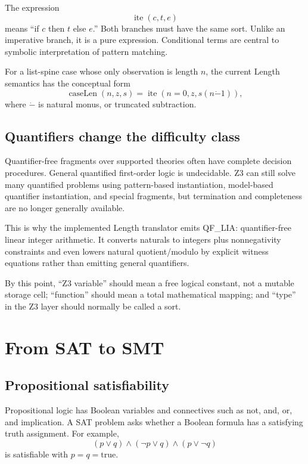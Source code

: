\documentclass[10pt,letterpaper,oneside]{report}
\newcommand{\QFLIA}{\textsf{QF\_LIA}}
\begin{document}
The expression
\[
  \operatorname{ite}(c,t,e)
\]
means ``if $c$ then $t$ else $e$.'' Both branches must have the same sort. Unlike an imperative branch, it is a pure expression. Conditional terms are central to symbolic interpretation of pattern matching.

For a list-spine case whose only observation is length $n$, the current Length semantics has the conceptual form
\[
  \operatorname{caseLen}(n,z,s)=
  \operatorname{ite}(n=0,z,s(n\mathbin{\dot{-}}1)),
\]
where $\dot{-}$ is natural monus, or truncated subtraction.

\section{Quantifiers change the difficulty class}

Quantifier-free fragments over supported theories often have complete decision procedures. General quantified first-order logic is undecidable. Z3 can still solve many quantified problems using pattern-based instantiation, model-based quantifier instantiation, and special fragments, but termination and completeness are no longer generally available.

This is why the implemented Length translator emits \QFLIA: quantifier-free linear integer arithmetic. It converts naturals to integers plus nonnegativity constraints and even lowers natural quotient/modulo by explicit witness equations rather than emitting general quantifiers.

\begin{checkpoint}
By this point, ``Z3 variable'' should mean a free logical constant, not a mutable storage cell; ``function'' should mean a total mathematical mapping; and ``type'' in the Z3 layer should normally be called a sort.
\end{checkpoint}

\chapter{From SAT to SMT}
\label{chap:sat-smt}

\section{Propositional satisfiability}

Propositional logic has Boolean variables and connectives such as not, and, or, and implication. A SAT problem asks whether a Boolean formula has a satisfying truth assignment. For example,
\[
  (p\lor q)\land(\neg p\lor q)\land(p\lor\neg q)
\]
is satisfiable with $p=q=\text{true}$.
\end{document}

